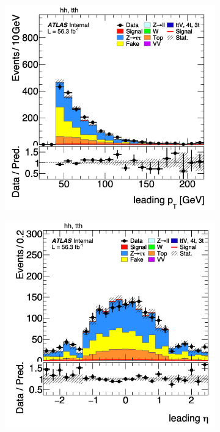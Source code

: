   \begin{figure}[htbp]
    \centering
    \begin{subfigure}[b]{0.45\textwidth}
        \centering
        \includegraphics[width=\textwidth]{images/leading_pt_gntau.png}
        \caption{}
    \end{subfigure}
    \begin{subfigure}[b]{0.45\textwidth}
        \centering
        \includegraphics[width=\textwidth]{images/leading_eta_gntau.png}
        \caption{}
    \end{subfigure}


\end{figure}
